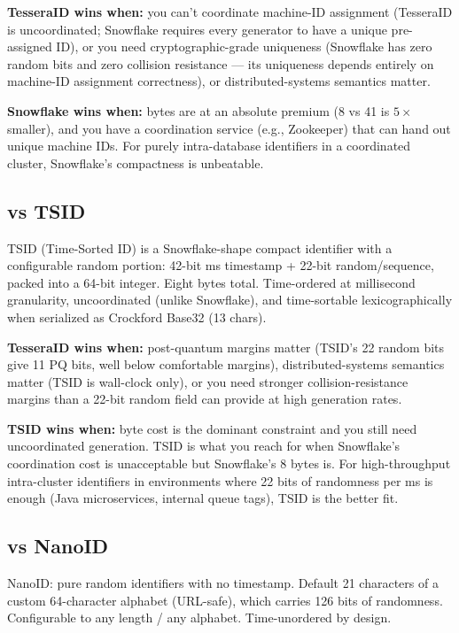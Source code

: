 \textbf{TesseraID wins when:} you can't coordinate machine-ID assignment (TesseraID is uncoordinated; Snowflake requires every generator to have a unique pre-assigned ID), or you need cryptographic-grade uniqueness (Snowflake has zero random bits and zero collision resistance --- its uniqueness depends entirely on machine-ID assignment correctness), or distributed-systems semantics matter.

\textbf{Snowflake wins when:} bytes are at an absolute premium (8 vs 41 is $5\times$ smaller), and you have a coordination service (e.g., Zookeeper) that can hand out unique machine IDs. For purely intra-database identifiers in a coordinated cluster, Snowflake's compactness is unbeatable.

\subsection{vs TSID \citep{tsid}}

TSID (Time-Sorted ID) is a Snowflake-shape compact identifier with a configurable random portion: 42-bit ms timestamp + 22-bit random/sequence, packed into a 64-bit integer. Eight bytes total. Time-ordered at millisecond granularity, uncoordinated (unlike Snowflake), and time-sortable lexicographically when serialized as Crockford Base32 (13 chars).

\textbf{TesseraID wins when:} post-quantum margins matter (TSID's 22 random bits give 11 PQ bits, well below comfortable margins), distributed-systems semantics matter (TSID is wall-clock only), or you need stronger collision-resistance margins than a 22-bit random field can provide at high generation rates.

\textbf{TSID wins when:} byte cost is the dominant constraint and you still need uncoordinated generation. TSID is what you reach for when Snowflake's coordination cost is unacceptable but Snowflake's 8 bytes is. For high-throughput intra-cluster identifiers in environments where 22 bits of randomness per ms is enough (Java microservices, internal queue tags), TSID is the better fit.

\subsection{vs NanoID \citep{nanoid}}

NanoID: pure random identifiers with no timestamp. Default 21 characters of a custom 64-character alphabet (URL-safe), which carries 126 bits of randomness. Configurable to any length / any alphabet. Time-unordered by design.

